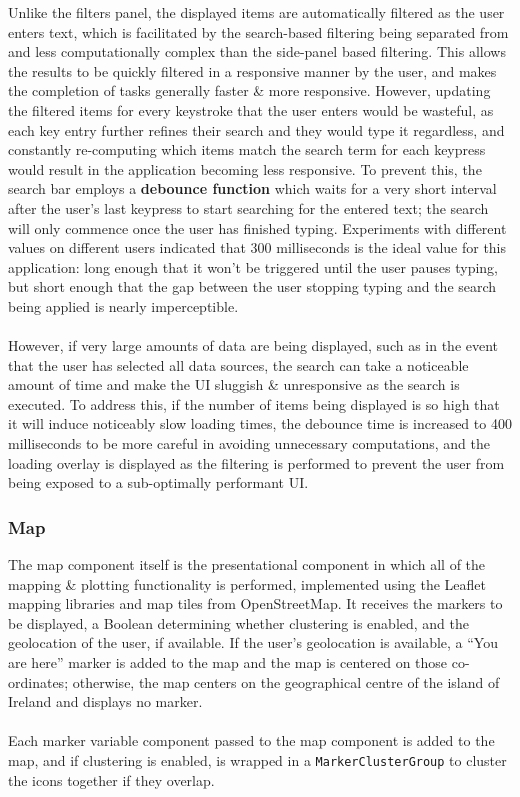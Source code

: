 \documentclass[a4paper,11pt]{report}
\begin{document}
Unlike the filters panel, the displayed items are automatically filtered as the user enters text, which is facilitated by the search-based filtering being separated from and less computationally complex than the side-panel based filtering.
This allows the results to be quickly filtered in a responsive manner by the user, and makes the completion of tasks generally faster \& more responsive.
However, updating the filtered items for every keystroke that the user enters would be wasteful, as each key entry further refines their search and they would type it regardless, and constantly re-computing which items match the search term for each keypress would result in the application becoming less responsive.
To prevent this, the search bar employs a \textbf{debounce function}\supercite{debounce} which waits for a very short interval after the user's last keypress to start searching for the entered text;
the search will only commence once the user has finished typing.
Experiments with different values on different users indicated that 300 milliseconds is the ideal value for this application:
long enough that it won't be triggered until the user pauses typing, but short enough that the gap between the user stopping typing and the search being applied is nearly imperceptible.
\\\\
However, if very large amounts of data are being displayed, such as in the event that the user has selected all data sources, the search can take a noticeable amount of time and make the UI sluggish \& unresponsive as the search is executed.
To address this, if the number of items being displayed is so high that it will induce noticeably slow loading times, the debounce time is increased to 400 milliseconds to be more careful in avoiding unnecessary computations, and the loading overlay is displayed as the filtering is performed to prevent the user from being exposed to a sub-optimally performant UI.

\subsubsection{Map}
The map component itself is the presentational component in which all of the mapping \& plotting functionality is performed, implemented using the Leaflet\supercite{leaflet} mapping libraries and map tiles from OpenStreetMap\supercite{osm}.
It receives the markers to be displayed, a Boolean determining whether clustering is enabled, and the geolocation of the user, if available.
If the user's geolocation is available, a ``You are here'' marker is added to the map and the map is centered on those co-ordinates;
otherwise, the map centers on the geographical centre of the island of Ireland\supercite{osi} and displays no marker.
\\\\
Each marker variable component passed to the map component is added to the map, and if clustering is enabled, is wrapped in a \texttt{MarkerClusterGroup} to cluster the icons together if they overlap.
\end{document}

